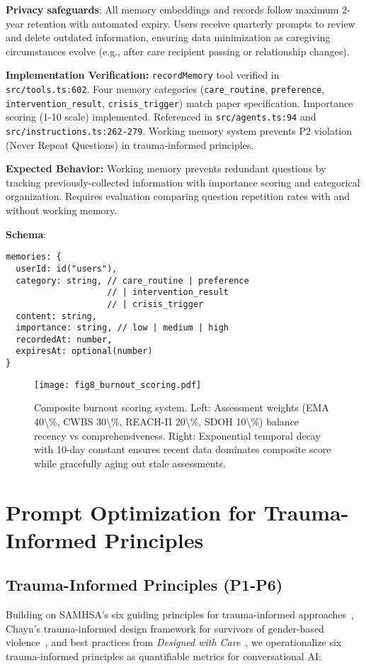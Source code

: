 \documentclass{article}
\begin{document}
\textbf{Privacy safeguards}: All memory embeddings and records follow maximum 2-year retention with automated expiry. Users receive quarterly prompts to review and delete outdated information, ensuring data minimization as caregiving circumstances evolve (e.g., after care recipient passing or relationship changes).

\textbf{Implementation Verification:} \texttt{recordMemory} tool verified in \texttt{src/tools.ts:602}. Four memory categories (\texttt{care\_routine}, \texttt{preference}, \texttt{intervention\_result}, \texttt{crisis\_trigger}) match paper specification. Importance scoring (1-10 scale) implemented. Referenced in \texttt{src/agents.ts:94} and \texttt{src/instructions.ts:262-279}. Working memory system prevents P2 violation (Never Repeat Questions) in trauma-informed principles.

\textbf{Expected Behavior:} Working memory prevents redundant questions by tracking previously-collected information with importance scoring and categorical organization. Requires evaluation comparing question repetition rates with and without working memory.

\textbf{Schema}:
\begin{verbatim}
memories: {
  userId: id("users"),
  category: string, // care_routine | preference
                    // | intervention_result
                    // | crisis_trigger
  content: string,
  importance: string, // low | medium | high
  recordedAt: number,
  expiresAt: optional(number)
}
\end{verbatim}

%
\begin{figure}[htbp]%
\centering%
\texttt{[image: fig8\_burnout\_scoring.pdf]}%
\caption{Composite burnout scoring system. Left: Assessment weights (EMA 40\textbackslash{}\%, CWBS 30\textbackslash{}\%, REACH{-}II 20\textbackslash{}\%, SDOH 10\textbackslash{}\%) balance recency vs comprehensiveness. Right: Exponential temporal decay with 10{-}day constant ensures recent data dominates composite score while gracefully aging out stale assessments.}%
\label{fig:burnout}%
\end{figure}%
\section{Prompt Optimization for Trauma{-}Informed Principles}%
\label{sec:PromptOptimizationforTrauma{-}InformedPrinciples}%
%
\subsection{Trauma{-}Informed Principles (P1{-}P6)}%
\label{subsec:Trauma{-}InformedPrinciples(P1{-}P6)}%
Building on SAMHSA's six guiding principles for trauma-informed approaches~\cite{samhsa2014}, Chayn's trauma-informed design framework for survivors of gender-based violence~\cite{chayn2024}, and best practices from \textit{Designed with Care}~\cite{edwards2024}, we operationalize six trauma-informed principles as quantifiable metrics for conversational AI:
\end{document}
